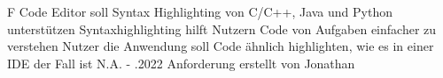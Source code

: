\begin{myreq}
    \threeinline
    {\reqno }
    {\reqtype F}
    { }
    \reqdesc Code Editor soll Syntax Highlighting von C/C++, Java und Python unterstützen
    \reqrat Syntaxhighlighting hilft Nutzern Code von Aufgaben einfacher zu verstehen
    \reqorig Nutzer
    \reqfit die Anwendung soll Code ähnlich highlighten, wie es in einer IDE der Fall ist
    \twoinline
    {}
    {}
    \twoinline
    {}
    {\reqconf N.A.}
    \reqmater -
    .2022 Anforderung erstellt von Jonathan
\end{myreq}